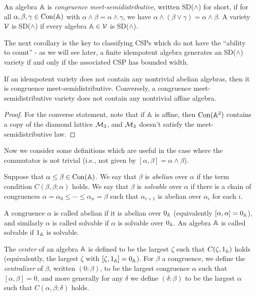 \documentclass[letterpaper,11pt]{article}
\DeclareMathOperator{\Con}{Con}
\begin{document}
\begin{defn} An algebra $\mathbb{A}$ is \emph{congruence meet-semidistributive}, written SD($\wedge$) for short, if for all $\alpha,\beta,\gamma \in \Con(\bA)$ with $\alpha \wedge \beta = \alpha\wedge \gamma$, we have $\alpha \wedge (\beta \vee \gamma) = \alpha \wedge \beta$. A variety $\mathcal{V}$ is SD($\wedge$) if every algebra $\mathbb{A} \in \mathcal{V}$ is SD($\wedge$).
\end{defn}

The next corollary is the key to classifying CSPs which do not have the ``ability to count'' - as we will see later, a finite idempotent algebra generates an SD($\wedge$) variety if and only if the associated CSP has bounded width.

\begin{cor}\label{cor-sd-meet} If an idempotent variety does not contain any nontrivial abelian algebras, then it is congruence meet-semidistributive. Conversely, a congruence meet-semidistributive variety does not contain any nontrivial affine algebra.
\end{cor}
\begin{proof} For the converse statement, note that if $\mathbb{A}$ is affine, then $\Con(\bA^2)$ contains a copy of the diamond lattice $\mathcal{M}_3$, and $\mathcal{M}_3$ doesn't satisfy the meet-semidistributive law.
\end{proof}

Now we consider some definitions which are useful in the case where the commutator is not trivial (i.e., not given by $[\alpha,\beta] = \alpha \wedge \beta$).

\begin{defn} Suppose that $\alpha \le \beta \in \Con(\bA)$. We say that $\beta$ is \emph{abelian} over $\alpha$ if the term condition $C(\beta,\beta;\alpha)$ holds. We say that $\beta$ is \emph{solvable} over $\alpha$ if there is a chain of congruences $\alpha = \alpha_0 \le \cdots \le \alpha_n = \beta$ such that $\alpha_{i+1}$ is abelian over $\alpha_i$ for each $i$.

A congruence $\alpha$ is called abelian if it is abelian over $0_{\mathbb{A}}$ (equivalently $[\alpha,\alpha] = 0_{\mathbb{A}}$), and similarly $\alpha$ is called solvable if $\alpha$ is solvable over $0_{\mathbb{A}}$. An algebra $\mathbb{A}$ is called solvable if $1_{\mathbb{A}}$ is solvable.

The \emph{center} of an algebra $\mathbb{A}$ is defined to be the largest $\zeta$ such that $C(\zeta,1_{\mathbb{A}})$ holds (equivalently, the largest $\zeta$ with $[\zeta, 1_{\mathbb{A}}] = 0_{\mathbb{A}}$). For $\beta$ a congruence, we define the \emph{centralizer} of $\beta$, written $(0:\beta)$, to be the largest congruence $\alpha$ such that $[\alpha,\beta] = 0$, and more generally for any $\delta$ we define $(\delta:\beta)$ to be the largest $\alpha$ such that $C(\alpha,\beta;\delta)$ holds.
\end{defn}
\end{document}
